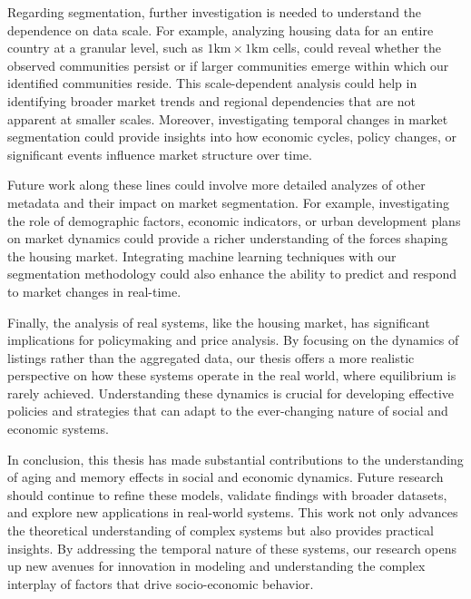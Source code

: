 Regarding segmentation, further investigation is needed to understand the dependence on data scale. For example, analyzing housing data for an entire country at a granular level, such as $1 \textrm{km} \times 1 \textrm{km}$ cells, could reveal whether the observed communities persist or if larger communities emerge within which our identified communities reside. This scale-dependent analysis could help in identifying broader market trends and regional dependencies that are not apparent at smaller scales. Moreover, investigating temporal changes in market segmentation could provide insights into how economic cycles, policy changes, or significant events influence market structure over time.

Future work along these lines could involve more detailed analyzes of other metadata and their impact on market segmentation. For example, investigating the role of demographic factors, economic indicators, or urban development plans on market dynamics could provide a richer understanding of the forces shaping the housing market. Integrating machine learning techniques with our segmentation methodology could also enhance the ability to predict and respond to market changes in real-time.

Finally, the analysis of real systems, like the housing market, has significant implications for policymaking and price analysis. By focusing on the dynamics of listings rather than the aggregated data, our thesis offers a more realistic perspective on how these systems operate in the real world, where equilibrium is rarely achieved. Understanding these dynamics is crucial for developing effective policies and strategies that can adapt to the ever-changing nature of social and economic systems.

In conclusion, this thesis has made substantial contributions to the understanding of aging and memory effects in social and economic dynamics. Future research should continue to refine these models, validate findings with broader datasets, and explore new applications in real-world systems. This work not only advances the theoretical understanding of complex systems but also provides practical insights. By addressing the temporal nature of these systems, our research opens up new avenues for innovation in modeling and understanding the complex interplay of factors that drive socio-economic behavior.
